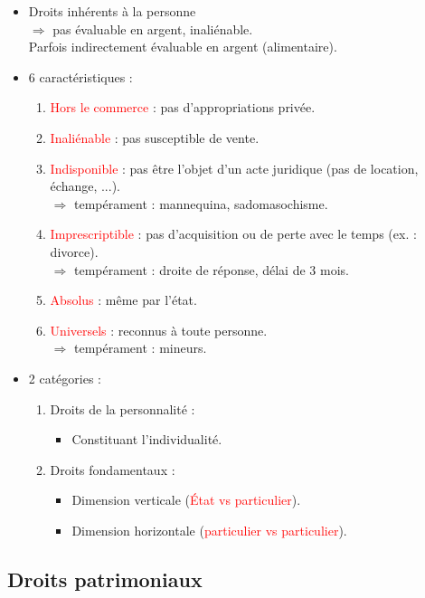 \begin{itemize}
	\item Droits inhérents à la personne \\
	$\Rightarrow$ pas évaluable en argent, inaliénable.\\
	\textcolor{red}{\warning} Parfois indirectement évaluable en argent (alimentaire).
	\item 6 caractéristiques :
	\begin{enumerate}
		\item \textcolor{red}{Hors le commerce} : pas d'appropriations privée.
		\item \textcolor{red}{Inaliénable} : pas susceptible de vente.
		\item \textcolor{red}{Indisponible} : pas être l'objet d'un acte juridique (pas de location, échange, ...).\\
		$\Rightarrow$ tempérament : mannequina, sadomasochisme.
		\item \textcolor{red}{Imprescriptible} : pas d'acquisition ou de perte avec le temps (ex. : divorce).\\
		$\Rightarrow$ tempérament : droite de réponse, délai de 3 mois.
		\item \textcolor{red}{Absolus} : même par l'état.
		\item \textcolor{red}{Universels} : reconnus à toute personne.\\
		$\Rightarrow$ tempérament : mineurs.
	\end{enumerate}
	\item 2 catégories :
	\begin{enumerate}
		\item Droits de la personnalité :
		\begin{itemize}
			\item Constituant l'individualité.
		\end{itemize}
		\item Droits fondamentaux :
		\begin{itemize}
			\item Dimension verticale (\textcolor{red}{État vs particulier}).
			\item Dimension horizontale (\textcolor{red}{particulier vs particulier}).
		\end{itemize}
	\end{enumerate}
\end{itemize}

\subsection{Droits patrimoniaux}

